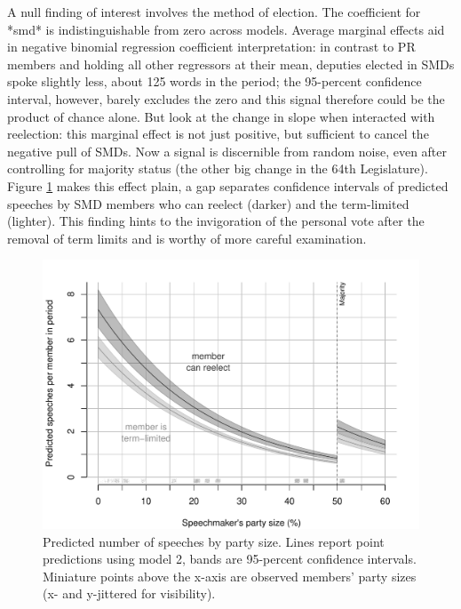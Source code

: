 \documentclass[letter,12pt]{article}
\begin{document}

A null finding of interest involves the method of election. The coefficient for *smd* is indistinguishable from zero across models. Average marginal effects aid in negative binomial regression coefficient interpretation: in contrast to PR members and holding all other regressors at their mean, deputies elected in SMDs spoke slightly less, about 125 words in the period; the 95-percent confidence interval, however, barely excludes the zero and this signal therefore could be the product of chance alone. But look at the change in slope when interacted with reelection: this marginal effect is not just positive, but sufficient to cancel the negative pull of SMDs. Now a signal is discernible from random noise, even after controlling for majority status (the other big change in the 64th Legislature). Figure \ref{F:predict} makes this effect plain, a gap separates confidence intervals of predicted speeches by SMD members who can reelect (darker) and the term-limited (lighter). This finding hints to the invigoration of the personal vote after the removal of term limits and is worthy of more careful examination. 

\begin{figure}
  \centering
    \includegraphics[width=.67\columnwidth]{../plots/predictedWords.pdf}
    \caption{Predicted number of speeches by party size. Lines report point predictions using model 2, bands are 95-percent confidence intervals. Miniature points above the x-axis are observed members' party sizes (x- and y-jittered for visibility).}\label{F:predict}
\end{figure}
\end{document}
